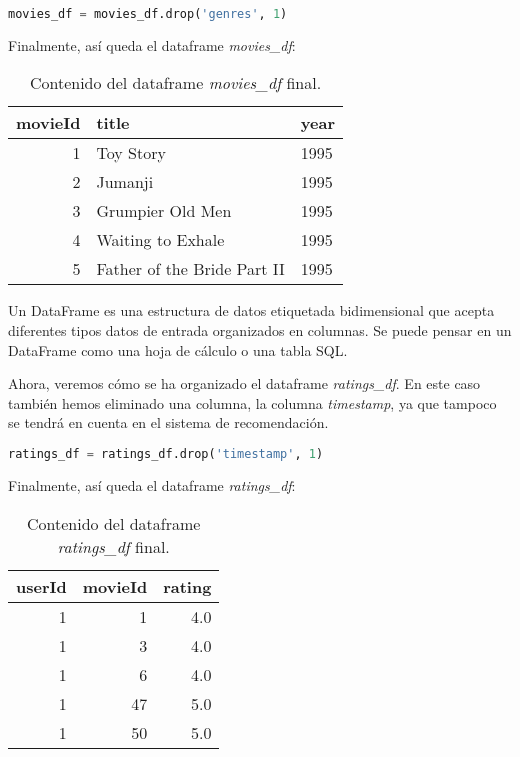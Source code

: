 \documentclass{uimppracticas}
\begin{document}
\begin{lstlisting}[language=python]
movies_df = movies_df.drop('genres', 1)
\end{lstlisting}

Finalmente, así queda el dataframe \textit{movies\_df}:

\begin{table}[h]
	\centering
	\begin{tabular}{rll}
		\toprule
		movieId &                        title &  year \\
		\midrule
		1 &                    Toy Story &  1995 \\
		2 &                      Jumanji &  1995 \\
		3 &             Grumpier Old Men &  1995 \\
		4 &            Waiting to Exhale &  1995 \\
		5 &  Father of the Bride Part II &  1995 \\
		\bottomrule
	\end{tabular}
	\caption{Contenido del dataframe \textit{movies\_df} final.}
	\label{movies_df_final}
\end{table}

\begin{definition}\label{dataframe}
	Un DataFrame es una estructura de datos etiquetada bidimensional que acepta diferentes tipos datos de entrada organizados en columnas. Se puede pensar en un DataFrame como una hoja de cálculo o una tabla SQL.
\end{definition}

Ahora, veremos cómo se ha organizado el dataframe \textit{ratings\_df}. En este caso también hemos eliminado una columna, la columna \textit{timestamp}, ya que tampoco se tendrá en cuenta en el sistema de recomendación.

\begin{lstlisting}[language=python]
ratings_df = ratings_df.drop('timestamp', 1)
\end{lstlisting}

Finalmente, así queda el dataframe \textit{ratings\_df}:

\begin{table}[h]
	\centering
	\begin{tabular}{rrr}
		\toprule
		userId &  movieId &  rating \\
		\midrule
		1 &        1 &     4.0 \\
		1 &        3 &     4.0 \\
		1 &        6 &     4.0 \\
		1 &       47 &     5.0 \\
		1 &       50 &     5.0 \\
		\bottomrule
	\end{tabular}
	\caption{Contenido del dataframe \textit{ratings\_df} final.}
	\label{ratings_df_final}
\end{table}
\end{document}

